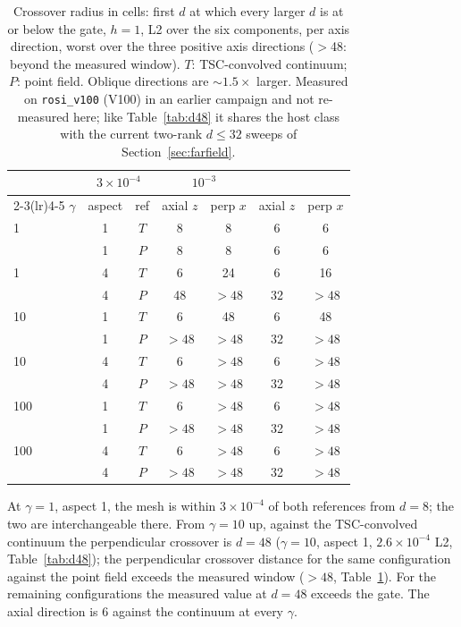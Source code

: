 \begin{table}[t]
\centering
\small
\caption{Crossover radius in cells: first $d$ at which every larger $d$ is
at or below the gate, $h=1$, L2 over the six components, per axis
direction, worst over the three positive axis directions ($>$48: beyond the
measured window). $T$: TSC-convolved continuum; $P$: point field. Oblique
directions are $\sim1.5\times$ larger. Measured on \texttt{rosi\_v100}
(V100) in an earlier campaign and not re-measured here; like
Table~\ref{tab:d48} it shares the host class with the current two-rank
$d\le32$ sweeps of Section~\ref{sec:farfield}.}
\label{tab:crossover}
\begin{tabular}{lcc|cc|cc}
\toprule
 & \multicolumn{2}{c}{$3\!\times\!10^{-4}$} & \multicolumn{2}{c}{$10^{-3}$} \\
\cmidrule(lr){2-3}\cmidrule(lr){4-5}
$\gamma$ & aspect & ref & axial $z$ & perp $x$ & axial $z$ & perp $x$ \\
\midrule
1   & 1 & $T$ & 8  & 8  & 6  & 6  \\
    & 1 & $P$ & 8  & 8  & 6  & 6  \\
1   & 4 & $T$ & 6  & 24 & 6  & 16 \\
    & 4 & $P$ & 48 & $>48$ & 32 & $>48$ \\
10  & 1 & $T$ & 6  & 48 & 6  & 48 \\
    & 1 & $P$ & $>48$ & $>48$ & 32 & $>48$ \\
10  & 4 & $T$ & 6  & $>48$ & 6  & $>48$ \\
    & 4 & $P$ & $>48$ & $>48$ & 32 & $>48$ \\
100 & 1 & $T$ & 6  & $>48$ & 6  & $>48$ \\
    & 1 & $P$ & $>48$ & $>48$ & 32 & $>48$ \\
100 & 4 & $T$ & 6  & $>48$ & 6  & $>48$ \\
    & 4 & $P$ & $>48$ & $>48$ & 32 & $>48$ \\
\bottomrule
\end{tabular}
\end{table}

At $\gamma=1$, aspect 1, the mesh is within $3\times10^{-4}$ of both
references from $d=8$; the two are interchangeable there. From $\gamma=10$
up, against the TSC-convolved continuum the perpendicular crossover is
$d=48$ ($\gamma=10$, aspect 1, $2.6\times10^{-4}$ L2,
Table~\ref{tab:d48}); the perpendicular crossover distance for the same
configuration against the point field exceeds the measured window
($>48$, Table~\ref{tab:crossover}). For the remaining configurations the
measured value at $d=48$ exceeds the gate. The axial direction is $6$
against the continuum at every $\gamma$.

